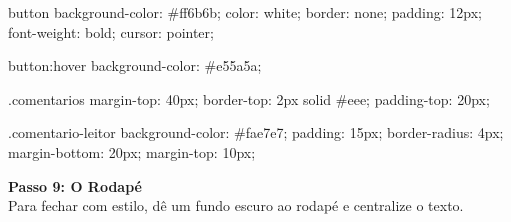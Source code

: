\documentclass[12pt,a4paper]{article}
\begin{document}
\begin{codecss}
button {
    background-color: #ff6b6b;
    color: white;
    border: none;
    padding: 12px;
    font-weight: bold;
    cursor: pointer;
}

button:hover{
    background-color: #e55a5a;
}

.comentarios{
    margin-top: 40px;
    border-top: 2px solid #eee;
    padding-top: 20px;
}

.comentario-leitor {
    background-color: #fae7e7;
    padding: 15px;
    border-radius: 4px;
    margin-bottom: 20px;
    margin-top: 10px;
}
\end{codecss}

\noindent\textbf{Passo 9: O Rodapé}\\
Para fechar com estilo, dê um fundo escuro ao rodapé e centralize o texto.

\end{document}
